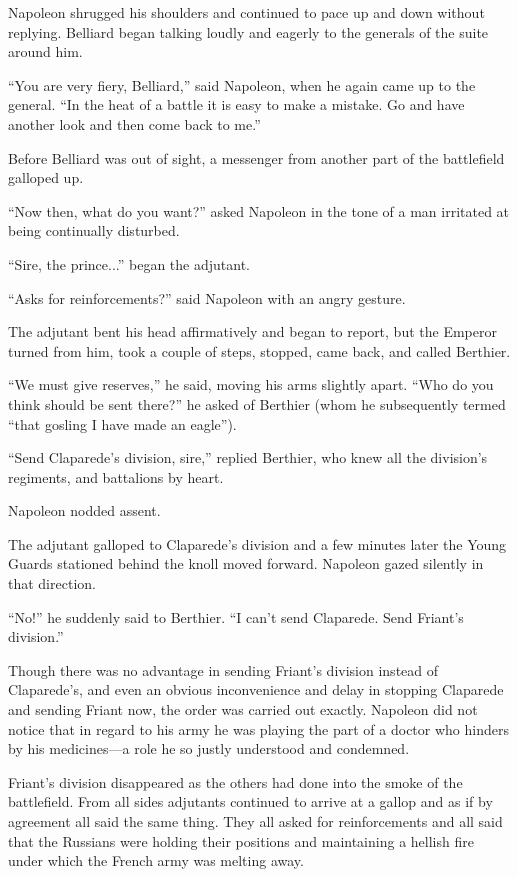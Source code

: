 Napoleon shrugged his shoulders and continued to pace up and down
without replying. Belliard began talking loudly and eagerly to
the generals of the suite around him.

``You are very fiery, Belliard,'' said Napoleon, when he again
came up to the general. ``In the heat of a battle it is easy to
make a mistake. Go and have another look and then come back to
me.''

Before Belliard was out of sight, a messenger from another part
of the battlefield galloped up.

``Now then, what do you want?'' asked Napoleon in the tone of a
man irritated at being continually disturbed.

``Sire, the prince...'' began the adjutant.

``Asks for reinforcements?'' said Napoleon with an angry gesture.

The adjutant bent his head affirmatively and began to report, but
the Emperor turned from him, took a couple of steps, stopped,
came back, and called Berthier.

``We must give reserves,'' he said, moving his arms slightly
apart. ``Who do you think should be sent there?'' he asked of
Berthier (whom he subsequently termed ``that gosling I have made
an eagle'').

``Send Claparede's division, sire,'' replied Berthier, who knew
all the division's regiments, and battalions by heart.

Napoleon nodded assent.

The adjutant galloped to Claparede's division and a few minutes
later the Young Guards stationed behind the knoll moved
forward. Napoleon gazed silently in that direction.

``No!'' he suddenly said to Berthier. ``I can't send
Claparede. Send Friant's division.''

Though there was no advantage in sending Friant's division
instead of Claparede's, and even an obvious inconvenience and
delay in stopping Claparede and sending Friant now, the order was
carried out exactly.  Napoleon did not notice that in regard to
his army he was playing the part of a doctor who hinders by his
medicines---a role he so justly understood and condemned.

Friant's division disappeared as the others had done into the
smoke of the battlefield. From all sides adjutants continued to
arrive at a gallop and as if by agreement all said the same
thing. They all asked for reinforcements and all said that the
Russians were holding their positions and maintaining a hellish
fire under which the French army was melting away.

